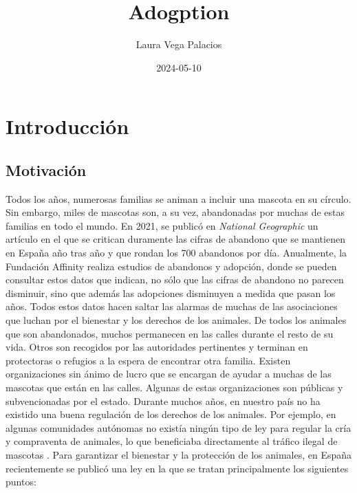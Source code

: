\documentclass[a4paper, 12pt]{article}
\title{Adogption}
\date{2024-05-10}
\author{Laura Vega Palacios}
\begin{document}




\newpage
\thispagestyle{empty}
\mbox{}
\newpage
\thispagestyle{empty}
\mbox{}

\tableofcontents
\listoftables
\listoffigures

\newpage
\thispagestyle{empty}
\mbox{}

\newpage
\section{Introducción}

\subsection{Motivación}

Todos los años, numerosas familias se animan a incluir una mascota en su círculo. Sin embargo, miles de mascotas son, a su vez, abandonadas por muchas de estas familias en todo el mundo. En 2021, se publicó en \textit{National Geographic} un artículo \cite{nationalgeographic} en el que se critican duramente las cifras de abandono que se mantienen en España año tras año y que rondan los 700 abandonos por día. Anualmente, la Fundación Affinity realiza estudios de abandonos y adopción, donde se pueden consultar estos datos \cite{affinity} que indican, no sólo que las cifras de abandono no parecen disminuir, sino que además las adopciones disminuyen a medida que pasan los años. Todos estos datos hacen saltar las alarmas de muchas de las asociaciones que luchan por el bienestar y los derechos de los animales. De todos los animales que son abandonados, muchos permanecen en las calles durante el resto de su vida. Otros son recogidos por las autoridades pertinentes y terminan en protectoras o refugios a la espera de encontrar otra familia. Existen organizaciones sin ánimo de lucro que se encargan de ayudar a muchas de las mascotas que están en las calles. Algunas de estas organizaciones son públicas y subvencionadas por el estado. Durante muchos años, en nuestro país no ha existido una buena regulación de los derechos de los animales. Por ejemplo, en algunas comunidades autónomas no existía ningún tipo de ley para regular la cría y compraventa de animales, lo que beneficiaba directamente al tráfico ilegal de mascotas \cite{trafico}. Para garantizar el bienestar y la protección de los animales, en España recientemente se publicó una ley \cite{ley} en la que se tratan principalmente los siguientes puntos:
\end{document}
